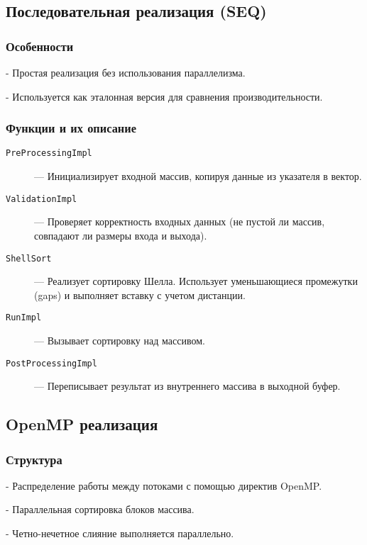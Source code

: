 \documentclass[12pt]{article}
\begin{document}
\subsection{Последовательная реализация (SEQ)}
\subsubsection*{Особенности}

    
- Простая реализация без использования параллелизма.
    
- Используется как эталонная версия для сравнения производительности.


\subsubsection*{Функции и их описание}
\begin{description}
    \item[\texttt{PreProcessingImpl}] — Инициализирует входной массив, копируя данные из указателя в вектор.
    \item[\texttt{ValidationImpl}] — Проверяет корректность входных данных (не пустой ли массив, совпадают ли размеры входа и выхода).
    \item[\texttt{ShellSort}] — Реализует сортировку Шелла. Использует уменьшающиеся промежутки (gaps) и выполняет вставку с учетом дистанции.
    \item[\texttt{RunImpl}] — Вызывает сортировку над массивом.
    \item[\texttt{PostProcessingImpl}] — Переписывает результат из внутреннего массива в выходной буфер.
\end{description}

\subsection{OpenMP реализация}
\subsubsection*{Структура}

    
- Распределение работы между потоками с помощью директив OpenMP.
    
- Параллельная сортировка блоков массива.
    
- Четно-нечетное слияние выполняется параллельно.
\end{document}
